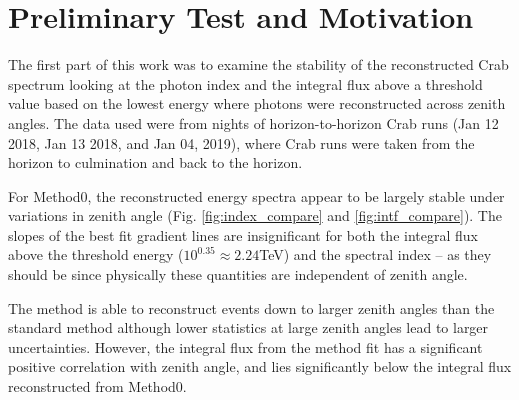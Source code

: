 \documentclass[main.tex]{subfiles}
\begin{document}
\section{Preliminary Test and Motivation}
The first part of this work was to examine the stability of the reconstructed Crab spectrum looking at the photon index and the integral flux above a threshold value based on the lowest energy where photons were reconstructed across zenith angles. The data used were from nights of horizon-to-horizon Crab runs (Jan 12 2018, Jan 13 2018, and Jan 04, 2019), where Crab runs were taken from the horizon to culmination and back to the horizon.

For Method0, the reconstructed energy spectra appear to be largely stable under variations in zenith angle (Fig. \ref{fig:index_compare} and \ref{fig:intf_compare}). The slopes of the best fit gradient lines are insignificant for both the integral flux above the threshold energy ($10^{0.35} \approx 2.24$TeV) and the spectral index -- as they should be since physically these quantities are independent of zenith angle.

The \disp method is able to reconstruct events down to larger zenith angles than the standard method although lower statistics at large zenith angles lead to larger uncertainties. However, the integral flux from the \disp method fit has a significant positive correlation with zenith angle, and lies significantly below the integral flux reconstructed from Method0.
\end{document}

